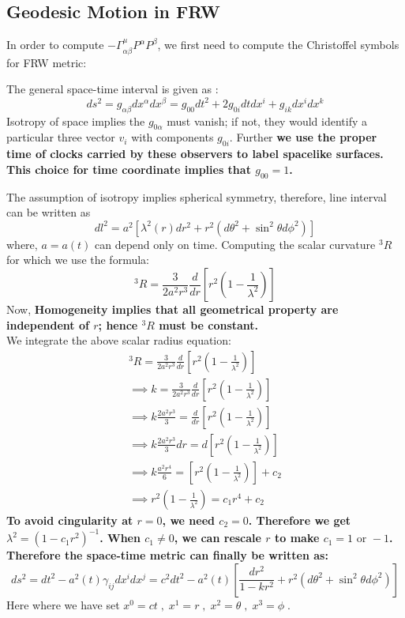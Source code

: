 \documentclass[12pt]{report}
\newcommand{\ch}[2]{\Gamma^{#1}_{#2}}
\newcommand{\cbox}{tcolorbox}
\newcommand{\cc}[1]{\left({#1}\right)}
\newcommand{\rr}[1]{\left[{#1}\right]}
\begin{document}
\subsection{Geodesic Motion in FRW}
In order to compute $- \ch{\mu}{\alpha \beta} P^\alpha P^\beta$, we first need to compute the Christoffel symbols for FRW metric:

\begin{\cbox}
The general space-time interval is given as :
\begin{equation}
ds^2=g_{\alpha\beta}dx^\alpha dx^\beta=g_{00}dt^2+2g_{0i}dt dx^i + g_{ik}dx^idx^k
\end{equation}
Isotropy of space implies the $g_{0\alpha}$ must vanish; if not, they would identify a particular three vector $v_i$ with components $g_{0i}$. Further \textbf{we use the proper time of clocks carried by these observers to label spacelike surfaces. This choice for time coordinate implies that $g_{00}=1$.}
\end{\cbox}

The assumption of isotropy implies spherical symmetry, therefore, line interval can be written as 
\begin{equation}
dl^2=a^2\rr{\lambda^2(r)dr^2+r^2(d\theta^2 + \sin^2 \theta d\phi^2)}
\end{equation}
where, $a=a(t)$ can depend only on time. Computing the scalar curvature  ${}^3R$ for which we use the formula:
\begin{equation}
{}^3R=\frac{3}{2 a^2 r^3}\frac{d}{dr}\rr{r^2\cc{1-\frac{1}{\lambda^2}}}
\end{equation}
Now, \textbf{Homogeneity implies that all geometrical property are independent of $r$; hence ${}^3R$ must be constant.}
\\
We integrate the above scalar radius equation:
\begin{eqnarray*}
{}^3R=\frac{3}{2 a^2 r^3}\frac{d}{dr}\rr{r^2\cc{1-\frac{1}{\lambda^2}}}\\
\implies k=\frac{3}{2 a^2 r^3}\frac{d}{dr}\rr{r^2\cc{1-\frac{1}{\lambda^2}}}\\
\implies k \frac{2 a^2 r^3}{3}=\frac{d}{dr}\rr{r^2\cc{1-\frac{1}{\lambda^2}}}\\
\implies k \frac{2 a^2 r^3}{3}dr=d\rr{r^2\cc{1-\frac{1}{\lambda^2}}}\\
\implies k \frac{a^2 r^4}{6}=\rr{r^2\cc{1-\frac{1}{\lambda^2}}}+c_2\\
\implies r^2\cc{1-\frac{1}{\lambda^2}}= c_1r^4+c_2
\end{eqnarray*}
\textbf{To avoid cingularity at $r=0$, we need $c_2=0$. Therefore we get $\lambda^2=\cc{1-c_1r^2}^{-1}$. When $c_1 \neq 0$, we can rescale $r$ to make $c_1=1 \text{ or } -1$. Therefore the space-time metric can finally be written as:}
\begin{equation*}
ds^2=dt^2- a^2(t)\gamma_{ij}dx^i dx^j=c^2dt^2 - a^2(t)\left[\frac{dr^2}{1-kr^2}+r^2(d\theta^2+ \sin^2 \theta d\phi^2)\right]
\end{equation*}
Here where we have set $x^0=ct \; , \; x^1=r \; , \;x^2 = \theta \; ,\;x^3 = \phi \;$.
\end{document}
